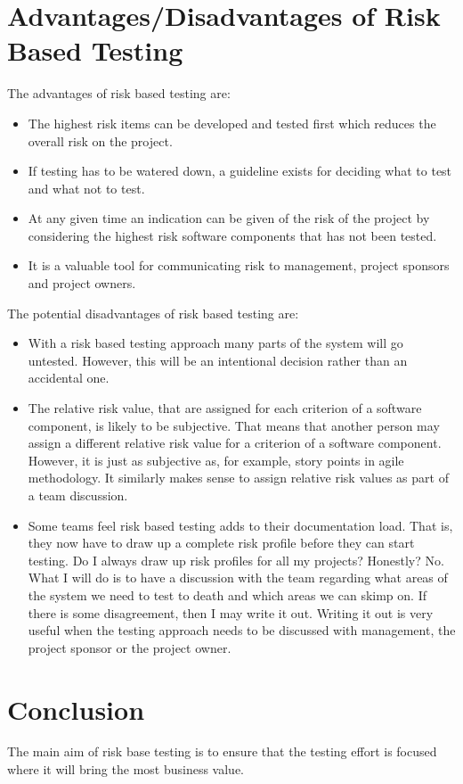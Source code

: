 \documentclass{amsart}
\begin{document}
\section{Advantages/Disadvantages of Risk Based Testing}
The advantages of risk based testing are:
\begin{itemize}
 \item The highest risk items can be developed and tested first which reduces the overall risk on
the project.
 \item If testing has to be watered down, a guideline exists for deciding what to test and what not
to test.
 \item At any given time an indication can be given of the risk of the project by considering the
highest risk software components that has not been tested.
\item It is a valuable tool for communicating risk to management, project sponsors and project owners.
\end{itemize}

The potential disadvantages of risk based testing are:
\begin{itemize}
	\item With a risk based testing approach many parts of the system will go untested. However, this will be an intentional decision rather than an accidental one.
	\item The relative risk value, that are assigned for each criterion of a software component, is likely to be subjective. That means that another person may assign a different relative risk value for a criterion of a software component. However, it is just as subjective as, for example, story points in agile methodology. It similarly makes sense to assign relative risk values as part of a team discussion.
	\item Some teams feel risk based testing adds to their documentation load. That is, they now have to draw up a complete risk profile before they can start testing. Do I always draw up risk profiles for all my projects? Honestly? No. What I will do is to have a discussion with the team regarding what areas of the system we need to test to death and which areas we can skimp on. If there is some disagreement, then I may write it out. Writing it out is very useful when the testing approach needs to be discussed with management, the project sponsor or the project owner.
\end{itemize}	


\section{Conclusion}
The main aim of risk base testing is to ensure that the testing effort is focused where it will bring the most business value.


 
\end{document}
